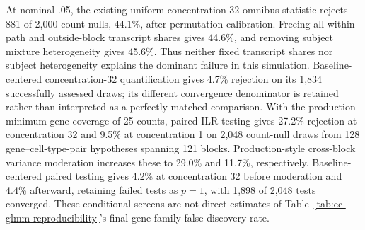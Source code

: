 \documentclass[11pt]{article}
\begin{document}
At nominal .05, the existing uniform concentration-32 omnibus statistic rejects 881 of 2,000 count nulls, 44.1\%, after permutation calibration. Freeing all within-path and outside-block transcript shares gives 44.6\%, and removing subject mixture heterogeneity gives 45.6\%. Thus neither fixed transcript shares nor subject heterogeneity explains the dominant failure in this simulation. Baseline-centered concentration-32 quantification gives 4.7\% rejection on its 1,834 successfully assessed draws; its different convergence denominator is retained rather than interpreted as a perfectly matched comparison. With the production minimum gene coverage of 25 counts, paired ILR testing gives 27.2\% rejection at concentration 32 and 9.5\% at concentration 1 on 2,048 count-null draws from 128 gene--cell-type-pair hypotheses spanning 121 blocks. Production-style cross-block variance moderation increases these to 29.0\% and 11.7\%, respectively. Baseline-centered paired testing gives 4.2\% at concentration 32 before moderation and 4.4\% afterward, retaining failed tests as \(p=1\), with 1,898 of 2,048 tests converged. These conditional screens are not direct estimates of Table~\ref{tab:ec-glmm-reproducibility}'s final gene-family false-discovery rate.
\end{document}
